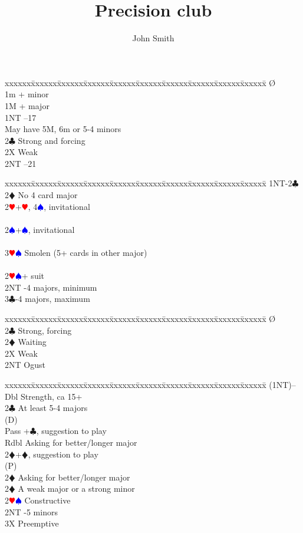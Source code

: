 \documentclass[a4paper]{article}
\title{Precision club}
\author{John Smith}
\newcommand{\BC}{\textcolor{OliveGreen}{$\clubsuit$}}
\newcommand{\BD}{\textcolor{RedOrange}{$\vardiamondsuit$}}
\newcommand{\BH}{\textcolor{Red}{$\varheartsuit${}}}
\newcommand{\BS}{\textcolor{Blue}{$\spadesuit${}}}
\newenvironment{bidtable}
{\begin{tabbing}

xxxxxx\=xxxxxx\=xxxxxx\=xxxxxx\=xxxxxx\=xxxxxx\=xxxxxx\=xxxxxx\=xxxxxx\=xxxxxx\=\kill}
{\end{tabbing} }%
\begin{document}
\maketitle
\tableofcontents

\begin{bidtable}
\O\+\\
1m + minor\\
1M + major\\
1NT --17\\
\>May have 5M, 6m or 5-4 minors\\
2\BC \> Strong and forcing\\
2X \> Weak\\
2NT --21\-
\end{bidtable}
\bigbreak
\begin{bidtable}
1NT-2\BC\+\\
2\BD \> No 4 card major\+\\
2\BH {}+\BH , 4\BS , invitational\\
\>\vspace{\baselineskip}\\
2\BS {}+\BS , invitational\\
\>\vspace{\baselineskip}\\
3\BH\BS \> Smolen (5+ cards in other major)\\
\>\vspace{\baselineskip}\-\\
2\BH\BS {}+ suit\\
2NT -4 majors, minimum\\
3\BC {}-4 majors, maximum\-
\end{bidtable}
\bigbreak
\begin{bidtable}
\O\+\\
2\BC \> Strong, forcing\+\\
2\BD \> Waiting\-\\
2X \> Weak\+\\
2NT \> Ogust\-\-
\end{bidtable}
\bigbreak
\begin{bidtable}
(1NT)--\+\\
Dbl \> Strength, ca 15+\\
2\BC \> At least 5-4 majors\+\\
(D)\+\\
Pass +\BC , suggestion to play\\
Rdbl \> Asking for better/longer major\\
2\BD {}+\BD , suggestion to play\-\\
(P)\+\\
2\BD \> Asking for better/longer major\-\-\\
2\BD \> A weak major or a strong minor\\
2\BH\BS \> Constructive\\
2NT -5 minors\\
3X \> Preemptive\-
\end{bidtable}
\end{document}
